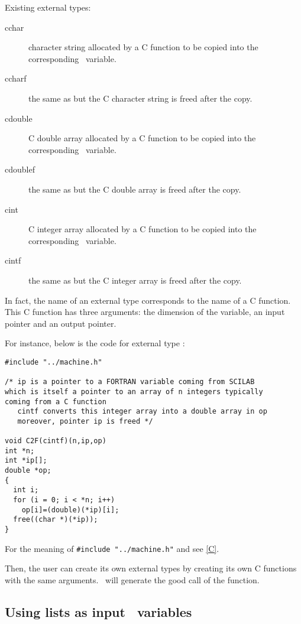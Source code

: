 \smallskip

Existing external types:
\begin{description}
 \item[cchar] character string allocated by a C function to be copied into the
corresponding \SCI\ variable.
 \item[ccharf] the same as  but the C character string is freed after
the copy.
 \item[cdouble] C double array allocated by a C function to be copied into the
corresponding \SCI\ variable.
 \item[cdoublef] the same as  but the C double array is freed after
the copy.
 \item[cint] C integer array allocated by a C function to be copied into the
corresponding \SCI\ variable.
 \item[cintf] the same as  but the C integer array is freed after
the copy.
\end{description}

\medskip

In fact, the name of an external type corresponds to the name of a C function.
This C function has three arguments: the dimension of the variable, an input
pointer and an output pointer.

For instance, below is the code for external type :
\begin{verbatim}
#include "../machine.h"   

/* ip is a pointer to a FORTRAN variable coming from SCILAB
which is itself a pointer to an array of n integers typically
coming from a C function
   cintf converts this integer array into a double array in op 
   moreover, pointer ip is freed */

void C2F(cintf)(n,ip,op)
int *n;
int *ip[];
double *op;
{
  int i;
  for (i = 0; i < *n; i++)
    op[i]=(double)(*ip)[i];
  free((char *)(*ip));
}
\end{verbatim}

For the meaning of \verb|#include "../machine.h"| and  see \ref{C}.

\smallskip

Then, the user can create its own external types by creating its own C
functions with the same arguments. \ISCI\ will generate the good call of the
function. 

\subsection{Using lists as input \SCI\ variables}
\label{list}

